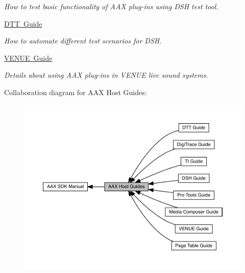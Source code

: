 \begin{DoxyCompactItemize}
\begin{DoxyCompactList}\small\item\em How to test basic functionality of A\+AX plug-\/ins using D\+SH test tool. \end{DoxyCompactList}\item 
\mbox{\hyperlink{a00836}{D\+T\+T Guide}}
\begin{DoxyCompactList}\small\item\em How to automate different test scenarios for D\+SH. \end{DoxyCompactList}\item 
\mbox{\hyperlink{a00849}{V\+E\+N\+U\+E Guide}}
\begin{DoxyCompactList}\small\item\em Details about using A\+AX plug-\/ins in V\+E\+N\+UE live sound systems. \end{DoxyCompactList}\end{DoxyCompactItemize}
Collaboration diagram for A\+AX Host Guides\+:
\nopagebreak
\begin{figure}[H]
\begin{center}
\leavevmode
\includegraphics[width=350pt]{a00829}
\end{center}
\end{figure}

